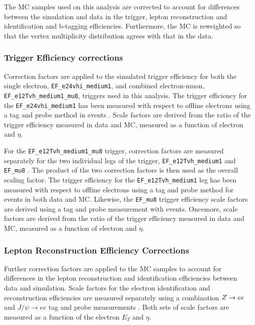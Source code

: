 The MC samples used on this analysis are corrected to account for differences
between the simulation and data in the trigger, lepton reconstruction and
identification and b-tagging efficiencies. Furthermore, the MC is
reweighted so that the vertex multiplicity distribution agrees with
that in the data.

\subsubsection{Trigger Efficiency corrections}
\label{sec:presel:TriggerCorr}

Correction factors are applied to the simulated trigger efficiency for
both the single electron, \linebreak \verb=EF_e24vhi_medium1=, and combined
electron-muon, \verb=EF_e12Tvh_medium1_mu8=, triggers used in this
analysis. The trigger efficiency for the \verb=EF_e24vhi_medium1= has
been measured with respect to offline electrons using a tag and probe
method in \Zee events \cite{SingleElecTrigSF}. Scale factors are derived from the ratio of the
trigger efficiency measured in data and MC, measured as a
function of electron \pt and $\eta$.

For the \verb=EF_e12Tvh_medium1_mu8= trigger, correction factors are
measured separately for the two individual legs of the trigger,
\verb=EF_e12Tvh_medium1= and \verb=EF_mu8= \cite{SingleEMuTrigSF}. The product of the two
correction factors is then used as the overall scaling factor. The
trigger efficiency for the \verb=EF_e12Tvh_medium1= leg has been
measured with respect to offline electrons using a tag and probe
method for \Zee events in both data and MC. Likewise, the
\verb=EF_mu8= trigger efficiency scale factors are derived using a tag
and probe measurement with \Zmumu events. Oncemore, scale factors are derived
from the ratio of the trigger efficiency measured in data and MC, measured as a
function of electron \pt and $\eta$.

\subsubsection{Lepton Reconstruction Efficiency Corrections}
\label{sec:presel:LepEffCorr}

Further correction factors are applied to the MC samples to account
for differences in the lepton reconstruction and identification
efficiencies between data and simulation. Scale factors for the electron
identification and reconstruction efficiencies are measured separately
using a combination $Z\rightarrow ee$ and $J / \psi \rightarrow e e$ tag and probe
measurements \cite{ElecSF}. Both sets of scale factors are measured as a function of the electron $E_{T}$ and $\eta$. 

